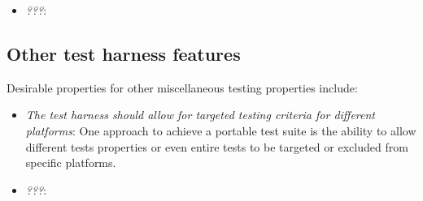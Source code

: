 \documentclass[pdf,ps2pdf,11pt]{SANDreport}
\begin{document}
\begin{itemize}
{}\item\textit{???}:

\end{itemize}

%
\subsection{Other test harness features}
%

Desirable properties for other miscellaneous testing properties
include:

\begin{itemize}

{}\item\textit{The test harness should allow for targeted testing
criteria for different platforms}: One approach to achieve a portable
test suite is the ability to allow different tests properties or even
entire tests to be targeted or excluded from specific platforms.

{}\item\textit{???}:

\end{itemize}


%
\clearpage




%



\begin{SANDdistribution}[NM]
\end{SANDdistribution}
\end{document}
